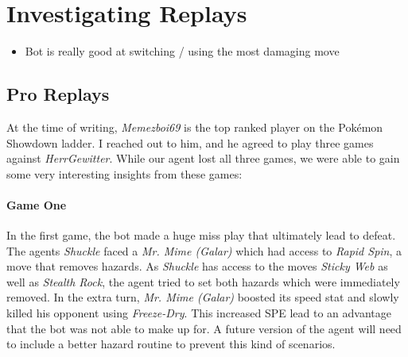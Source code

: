 \section{Investigating Replays}
\begin{itemize}
  \item Bot is really good at switching / using the most damaging move
\end{itemize}
\subsection{Pro Replays}
At the time of writing, \textit{Memezboi69} is the top ranked player on the Pokémon Showdown ladder. I reached
out to him, and he agreed to play three games against \textit{HerrGewitter}. While our agent lost all three 
games, we were able to gain some very interesting insights from these games:

\paragraph{Game One}
In the first game, the bot made a huge miss play that ultimately lead to defeat. The agents \textit{Shuckle} faced a 
\textit{Mr. Mime (Galar)} which had access to \textit{Rapid Spin}, a move that removes hazards. As \textit{Shuckle}
has access to the moves \textit{Sticky Web} as well as \textit{Stealth Rock}, the agent tried to set both hazards
which were immediately removed. In the extra turn, \textit{Mr. Mime (Galar)} boosted its speed stat and slowly
killed his opponent using \textit{Freeze-Dry}. This increased \ac{SPE} lead to an advantage that the bot was
not able to make up for. A future version of the agent will need to include a better hazard routine to prevent
this kind of scenarios.  

